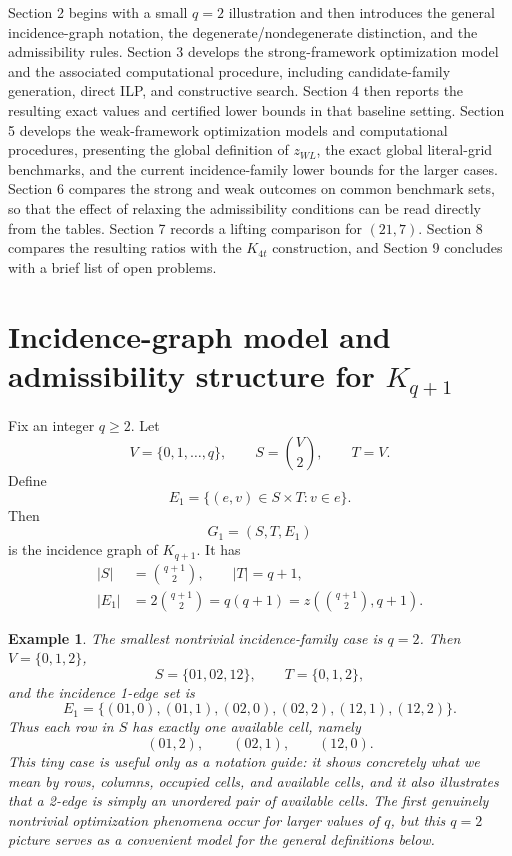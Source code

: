 \documentclass[10pt]{article}
\newcommand{\blue}[1]{#1}
\newcommand{\0}{\mathbf{0}}
\newcommand{\1}{\mathbf{1}}
\newtheorem{example}[Thm]{Example}
\begin{document}
{Section 2 begins with a small \(q=2\) illustration and then introduces the general incidence-graph notation, the degenerate/nondegenerate distinction, and the admissibility rules.} \blue{Section 3 develops the strong-framework optimization model and the associated computational procedure, including candidate-family generation, direct ILP, and constructive search.} {Section 4 then reports the resulting exact values and certified lower bounds in that baseline setting.} \blue{Section 5 develops the weak-framework optimization models and computational procedures, presenting the global definition of \(z_{WL}\), the exact global literal-grid benchmarks, and the current incidence-family lower bounds for the larger cases.} {Section 6 compares the strong and weak outcomes on common benchmark sets, so that the effect of relaxing the admissibility conditions can be read directly from the tables.} \blue{Section 7 records a lifting comparison for \((21,7)\).} Section 8 compares the resulting ratios with the \(K_{4t}\) construction, and Section 9 concludes with a brief list of open problems.

\section{Incidence-graph model and admissibility structure for \(K_{q+1}\)}

Fix an integer \(q\ge 2\). Let
\[
V=\{0,1,\dots,q\},\qquad S=\binom{V}{2},\qquad T=V.
\]
Define
\[
E_1=\{(e,v)\in S\times T: v\in e\}.
\]
Then
\[
G_1=(S,T,E_1)
\]
is the incidence graph of \(K_{q+1}\). It has
\[
\begin{aligned}
|S|&=\binom{q+1}{2},\qquad |T|=q+1,\\
|E_1|&=2\binom{q+1}{2}=q(q+1)=z\!\left(\binom{q+1}{2},q+1\right).
\end{aligned}
\]

\begin{example}
{The smallest nontrivial incidence-family case is \(q=2\). Then \(V=\{0,1,2\}\),}
\[
{S=\{01,02,12\},\qquad T=\{0,1,2\},}
\]
{and the incidence 1-edge set is}
\[
{E_1=\{(01,0),(01,1),(02,0),(02,2),(12,1),(12,2)\}.}
\]
{Thus each row in \(S\) has exactly one available cell, namely}
\[
{(01,2),\qquad (02,1),\qquad (12,0).}
\]
{This tiny case is useful only as a notation guide: it shows concretely what we mean by rows, columns, occupied cells, and available cells, and it also illustrates that a 2-edge is simply an unordered pair of available cells. The first genuinely nontrivial optimization phenomena occur for larger values of \(q\), but this \(q=2\) picture serves as a convenient model for the general definitions below.}
\end{example}
\end{document}
